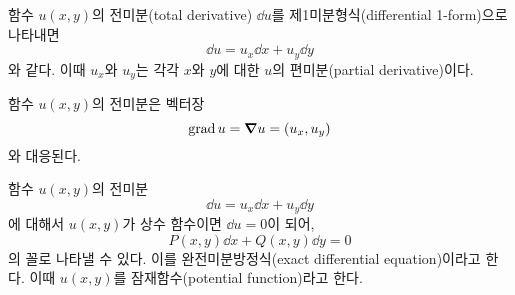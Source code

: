 \documentclass[../engineering_mathematics_lecture_note.tex]{subfiles}
\begin{document}
\begin{definition}
    함수 $u(x, y)$의 전미분(total derivative) $\dd{u}$를 제1미분형식(differential 1-form)으로 나타내면
    \begin{equation*}
        \dd{u} = u_x \dd{x} + u_y \dd{y}
    \end{equation*}
    와 같다.
    이때 $u_x$와 $u_y$는 각각 $x$와 $y$에 대한 $u$의 편미분(partial derivative)이다.
\end{definition}

\begin{remark}
    함수 $u(x, y)$의 전미분은 벡터장
    \begin{equation*}
        \operatorname{grad} u = \grad u = (u_x, u_y)
    \end{equation*}
    와 대응된다.
\end{remark}

\begin{definition}
    함수 $u(x, y)$의 전미분
    \begin{equation*}
        \dd{u} = u_x \dd{x} + u_y \dd{y}
    \end{equation*}
    에 대해서 $u(x, y)$가 상수 함수이면 $\dd{u} = 0$이 되어,
    \begin{equation*}
        P(x, y) \dd{x} + Q(x, y) \dd{y} = 0
    \end{equation*}
    의 꼴로 나타낼 수 있다.
    이를 완전미분방정식(exact differential equation)이라고 한다.
    이때 $u(x, y)$를 잠재함수(potential function)라고 한다.
\end{definition}
\end{document}
